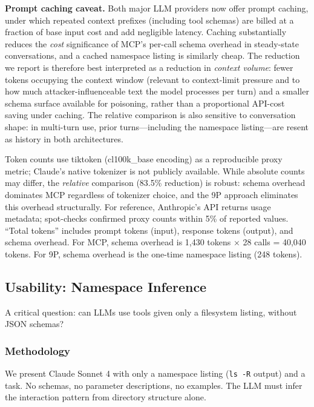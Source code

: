\documentclass[acmsmall,screen,review]{acmart}
\begin{document}
\textbf{Prompt caching caveat.} Both major LLM providers now offer prompt caching, under which repeated context prefixes (including tool schemas) are billed at a fraction of base input cost and add negligible latency. Caching substantially reduces the \textit{cost} significance of MCP's per-call schema overhead in steady-state conversations, and a cached namespace listing is similarly cheap. The reduction we report is therefore best interpreted as a reduction in \textit{context volume}: fewer tokens occupying the context window (relevant to context-limit pressure and to how much attacker-influenceable text the model processes per turn) and a smaller schema surface available for poisoning, rather than a proportional API-cost saving under caching. The relative comparison is also sensitive to conversation shape: in multi-turn use, prior turns---including the namespace listing---are resent as history in both architectures.

Token counts use tiktoken (cl100k\_base encoding) as a reproducible proxy metric;
Claude's native tokenizer is not publicly available. While absolute counts may
differ, the \textit{relative} comparison (83.5\% reduction) is robust: schema
overhead dominates MCP regardless of tokenizer choice, and the 9P approach
eliminates this overhead structurally. For reference, Anthropic's API returns
usage metadata; spot-checks confirmed proxy counts within 5\% of reported values.
``Total tokens'' includes prompt tokens (input), response tokens (output), and schema overhead. For MCP, schema overhead is 1,430 tokens $\times$ 28 calls = 40,040 tokens. For 9P, schema overhead is the one-time namespace listing (248 tokens).

\subsection{Usability: Namespace Inference}

A critical question: can LLMs use tools given only a filesystem listing, without JSON schemas?

\subsubsection{Methodology}

We present Claude Sonnet 4 with only a namespace listing (\texttt{ls -R} output) and a task. No schemas, no parameter descriptions, no examples. The LLM must infer the interaction pattern from directory structure alone.
\end{document}
